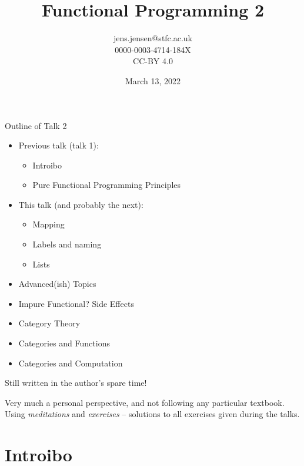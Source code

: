 \documentclass[presentation]{beamer}
\author{jens.jensen@stfc.ac.uk \\0000-0003-4714-184X\\CC-BY 4.0}
\date{March 13, 2022}
\title{Functional Programming 2}
\begin{document}
\maketitle
\begin{frame}{Outline of Talk 2}

  \begin{itemize}
    \item Previous talk (talk 1):
    \begin{itemize}
\item Introibo
\item Pure Functional Programming Principles
    \end{itemize}
  \item This talk (and probably the next):
    \begin{itemize}
    \item Mapping
    \item Labels and naming
    \item Lists
    \end{itemize}
    
  \item Advanced(ish) Topics
\item Impure Functional? Side Effects
\item Category Theory
\item Categories and Functions
\item Categories and Computation
\end{itemize}

Still written in the author's spare time!

\medskip

Very much a personal perspective, and not following any particular textbook.  Using \emph{meditations} and \emph{exercises} -- solutions to all exercises given during the talks.

\end{frame}


\section{Introibo}
\label{sec:org0edb596}
\end{document}
